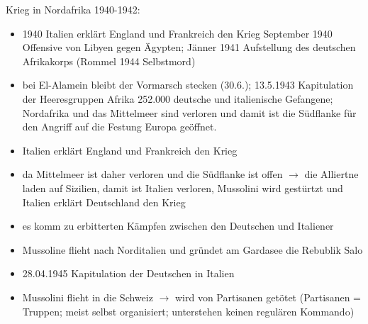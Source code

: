 \documentclass[a4paper,final]{report}
\begin{document}
Krieg in Nordafrika 1940-1942:
	\begin{itemize}
	\item 1940 Italien erklärt England und Frankreich den Krieg September 1940 Offensive von Libyen gegen Ägypten; Jänner 1941 Aufstellung des deutschen
	Afrikakorps (Rommel 1944 Selbstmord)
	\item bei El-Alamein bleibt der Vormarsch stecken (30.6.); 13.5.1943 Kapitulation der Heeresgruppen Afrika 252.000 deutsche und italienische Gefangene;
	Nordafrika und das Mittelmeer sind verloren und damit ist die Südflanke für den Angriff auf die Festung Europa geöffnet.
	\item Italien erklärt England und Frankreich den Krieg
	\item da Mittelmeer ist daher verloren und die Südflanke ist offen $\rightarrow$ die Alliertne laden auf Sizilien, damit ist Italien verloren, 				Mussolini 
	wird gestürtzt und Italien erklärt Deutschland den Krieg
	\item es komm zu erbitterten Kämpfen zwischen den Deutschen und Italiener
	\item Mussoline flieht nach Norditalien und gründet am Gardasee die Rebublik Salo
	\item 28.04.1945 Kapitulation der Deutschen in Italien
	\item Mussolini flieht in die Schweiz $\rightarrow$ wird von Partisanen getötet (Partisanen = Truppen; meist selbst organisiert; unterstehen keinen 
	regulären Kommando)
	\end{itemize}
\end{document}
